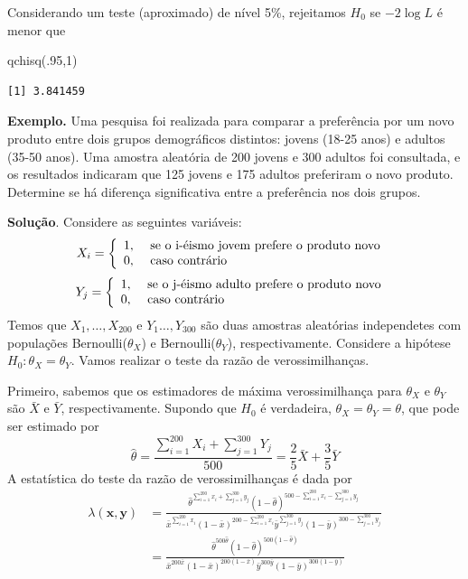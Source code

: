 \documentclass[
  letterpaper,
  DIV=11,
  numbers=noendperiod]{scrartcl}
\newenvironment{Shaded}{\begin{snugshade}}{\end{snugshade}}
\newcommand{\DecValTok}[1]{\textcolor[rgb]{0.68,0.00,0.00}{#1}}
\newcommand{\FunctionTok}[1]{\textcolor[rgb]{0.28,0.35,0.67}{#1}}
\newcommand{\NormalTok}[1]{\textcolor[rgb]{0.00,0.23,0.31}{#1}}
\begin{document}
Considerando um teste (aproximado) de nível 5\%, rejeitamos \(H_0\) se
\(-2\log L\) é menor que

\begin{Shaded}
\begin{Highlighting}[]
\FunctionTok{qchisq}\NormalTok{(.}\DecValTok{95}\NormalTok{,}\DecValTok{1}\NormalTok{)}
\end{Highlighting}
\end{Shaded}

\begin{verbatim}
[1] 3.841459
\end{verbatim}

\textbf{Exemplo.} Uma pesquisa foi realizada para comparar a preferência
por um novo produto entre dois grupos demográficos distintos: jovens
(18-25 anos) e adultos (35-50 anos). Uma amostra aleatória de 200 jovens
e 300 adultos foi consultada, e os resultados indicaram que 125 jovens e
175 adultos preferiram o novo produto. Determine se há diferença
significativa entre a preferência nos dois grupos.

\textbf{Solução}. Considere as seguintes variáveis:
\[X_i=\left\{\begin{array}{ll}1,&\hbox{ se o i-éismo jovem prefere o produto novo }\\0,& \hbox{ caso contrário}\end{array}\right.\]
\[Y_j=\left\{\begin{array}{ll}1,&\hbox{ se o j-éismo adulto prefere o produto novo }\\0,& \hbox{ caso contrário}\end{array}\right.\]
Temos que \(X_1,\ldots,X_{200}\) e \(Y_1\ldots,Y_{300}\) são duas
amostras aleatórias independetes com populações Bernoulli(\(\theta_X\))
e Bernoulli(\(\theta_Y\)), respectivamente. Considere a hipótese
\(H_0:\theta_X=\theta_Y\). Vamos realizar o teste da razão de
verossimilhanças.

Primeiro, sabemos que os estimadores de máxima verossimilhança para
\(\theta_X\) e \(\theta_Y\) são \(\bar{X}\) e \(\bar{Y}\),
respectivamente. Supondo que \(H_0\) é verdadeira,
\(\theta_X=\theta_Y=\theta\), que pode ser estimado por
\[\hat{\theta}=\frac{\sum_{i=1}^{200}X_i +\sum_{j=1}^{300}Y_j} {500}=\frac{2}{5}\bar{X}+\frac{3}{5}\bar{Y}\]
A estatística do teste da razão de verossimilhanças é dada por
\[\begin{align}\lambda(\textbf{x},\textbf{y})&=\frac{\hat{\theta}^{\sum_{i=1}^{200}x_i+\sum_{j=1}^{300}y_j}(1-\hat{\theta})^{500-\sum_{i=1}^{200}x_i-\sum_{j=1}^{300}y_j}}{\bar{x}^{\sum_{i=1}^{200}x_i}(1-\bar{x})^{200-\sum_{i=1}^{200}x_i}\bar{y}^{\sum_{j=1}^{300}y_j}(1-\bar{y})^{300-\sum_{j=1}^{300}y_j}}\\&=\frac{\hat{\theta}^{500\hat{\theta}}(1-\hat{\theta})^{500(1-\hat{\theta})}}{\bar{x}^{200\bar{x}}(1-\bar{x})^{200(1-\bar{x})}\bar{y}^{300\bar{y}}(1-\bar{y})^{300(1-\bar{y})}}\end{align}\]
\end{document}
